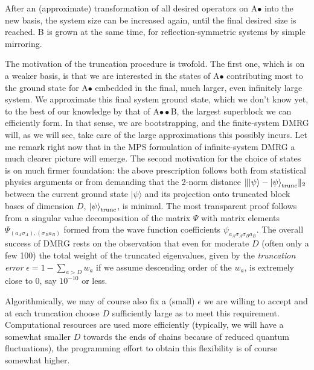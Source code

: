 \documentclass[a4paper,10pt,oneside,onecolumn,1p,times]{elsarticle}
\newcommand{\ket}[1]{\mbox{$| #1  \rangle$}}
\begin{document}
After an (approximate) transformation of all desired operators on A$\bullet$ into the new basis, the system size can be increased again, until the final desired size is reached. B is grown at the same time, for reflection-symmetric systems by simple mirroring.

The motivation of the truncation procedure is twofold. The first one, which is on a weaker basis, is that we are interested in the states of A$\bullet$ contributing most to the ground state for A$\bullet$ embedded in the final, much larger, even infinitely large system. We approximate this final system ground state, which we don't know yet, to the best of our knowledge by that of A$\bullet\bullet$B, the largest superblock we can efficiently form. In that sense, we are bootstrapping, and the finite-system DMRG will, as we will see, take care of the large approximations this possibly incurs. 
Let me remark right now that in the MPS formulation of infinite-system DMRG a much clearer picture will emerge. The second motivation for the choice of states is on much firmer foundation: the above prescription follows both from statistical physics arguments or from demanding that the 2-norm distance $\| \ket{\psi} - \ket{\psi}_{{\rm trunc}} \|_2$ between the current ground state $\ket{\psi}$ and its projection onto truncated block bases of dimension $D$, $\ket{\psi}_{{\rm trunc}}$, is minimal. The most transparent proof follows from a singular value decomposition of the matrix $\Psi$ with matrix elements $\Psi_{(a_A \sigma_A), (\sigma_B a_B)}$ formed from the wave function coefficients $\psi_{a_A \sigma_A\sigma_B a_B}$. The overall success of DMRG rests on the observation that even for moderate $D$ (often only a few 100) the total weight of the truncated eigenvalues, given by the {\em truncation error} $\epsilon=1-\sum_{a>D} w_a$ if we assume descending order of the $w_a$, is extremely close to 0, say $10^{-10}$ or less. 

Algorithmically, we may of course also fix a (small) $\epsilon$ we are willing to accept and at each truncation choose $D$ sufficiently large as to meet this requirement. Computational resources are used more efficiently (typically, we will have a somewhat smaller $D$ towards the ends of chains because of reduced quantum fluctuations), the programming effort to obtain this flexibility is of course somewhat higher.
\end{document}
